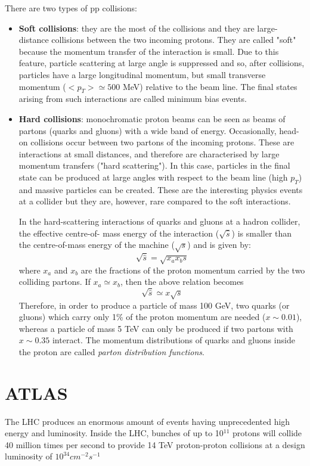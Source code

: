 \documentclass[a4paper, oneside, 11pt, openright]{book}
\begin{document}
				There are two types of pp collisions:
				\begin{itemize}
					\item \textbf{Soft collisions}: 
					they are the most of the collisions and they are large-distance collisions between the two incoming protons. They are called "soft" because the momentum transfer of the interaction is small. Due to this feature, particle scattering at large angle is suppressed and so, after collisions, particles have a large longitudinal momentum, but small transverse momentum ($<p_T>\simeq500$ MeV) relative to the beam line. The final states
					arising from such interactions are called minimum bias events.
					\item \textbf{Hard collisions}:
					monochromatic proton beams can be seen as beams of partons (quarks and gluons) with a wide band
					of energy. Occasionally, head-on collisions occur between two partons of the incoming protons. These are interactions at small distances, and therefore are characterised by large
					momentum transfers ("hard scattering"). In this case, particles in the final state can be produced at large angles with respect to the beam line (high $p_T$) and massive particles can be created.
					These are the interesting physics events at a collider but they are, however, rare compared to the soft interactions.
					
					In the hard-scattering interactions of quarks and gluons at a hadron collider, the effective centre-of-
					mass energy of the interaction ($\sqrt{\hat{s}}$) is smaller than the centre-of-mass energy of the machine ($\sqrt{s}$) and is given by: 
					$$ 
					\sqrt{\hat{s}} = \sqrt{x_ax_bs}
					$$
					where $x_a$ and $x_b$ are the fractions of the proton momentum carried by the two colliding partons. If $x_a \simeq x_b$, then the above relation becomes
					$$ 
					\sqrt{\hat{s}} \simeq x\sqrt{s}
					$$
					Therefore, in order to produce a particle of mass 100 GeV, two quarks (or gluons) which carry only 1\% of the proton momentum are needed ($x \sim 0.01$), whereas a particle of mass 5 TeV can only be produced if two partons with $x \sim 0.35$ interact. The momentum distributions of quarks and gluons inside the proton are called \textit{parton distribution functions}. %
				\end{itemize}
			
	
	
		\section{ATLAS}
			The LHC produces an enormous amount of events having unprecedented high energy and luminosity. Inside the LHC, bunches of up to 10$^{11}$ protons
			will collide 40 million times per second to provide 14 TeV proton-proton collisions at a design luminosity of $10^{34} cm^{-2} s^{-1}$
			
\end{document}
